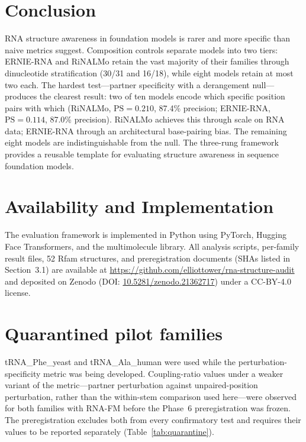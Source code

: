 \documentclass[11pt]{article}
\begin{document}
\section{Conclusion}

RNA structure awareness in foundation models is rarer and more
specific than naive metrics suggest. Composition controls separate
models into two tiers: ERNIE-RNA and RiNALMo retain the vast majority
of their families through dinucleotide stratification (30/31 and
16/18), while eight models retain at most two each. The hardest
test---partner specificity with a derangement null---produces the
clearest result: two of ten models encode which specific position
pairs with which (RiNALMo, $\text{PS} = 0.210$, 87.4\% precision;
ERNIE-RNA, $\text{PS} = 0.114$, 87.0\% precision). RiNALMo achieves
this through scale on RNA data; ERNIE-RNA through an architectural
base-pairing bias. The remaining eight models are indistinguishable
from the null. The three-rung framework provides a reusable template
for evaluating structure awareness in sequence foundation models.


\section*{Availability and Implementation}

The evaluation framework is implemented in Python using PyTorch,
Hugging Face Transformers, and the multimolecule library. All analysis
scripts, per-family result files, 52 Rfam structures, and
preregistration documents (SHAs listed in Section~3.1) are available at
\url{https://github.com/elliottower/rna-structure-audit} and
deposited on Zenodo (DOI:
\href{https://doi.org/10.5281/zenodo.21362717}{10.5281/zenodo.21362717})
under a CC-BY-4.0 license.

\appendix

\section{Quarantined pilot families}
\label{app:quarantine}

tRNA\_Phe\_yeast and tRNA\_Ala\_human were used while the
perturbation-specificity metric was being developed. Coupling-ratio values
under a weaker variant of the metric---partner perturbation against
unpaired-position perturbation, rather than the within-stem comparison used
here---were observed for both families with RNA-FM before the Phase~6
preregistration was frozen. The preregistration excludes both from every
confirmatory test and requires their values to be reported separately
(Table~\ref{tab:quarantine}).
\end{document}
